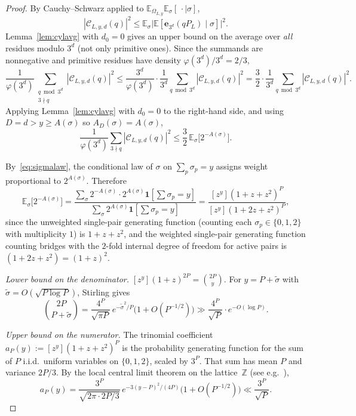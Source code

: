 \documentclass[11pt,a4paper]{amsart}
\theoremstyle{plain}
\theoremstyle{definition}
\newcommand{\Z}{\mathbb{Z}}
\newcommand{\E}{\mathbb{E}}
\begin{document}
\begin{proof}
By Cauchy--Schwarz applied to $\E_{\Omega_{L,y}}\E_\sigma[\,\cdot\mid\sigma]$,
$$
|\mathcal C_{L,y,d}(q)|^2\le\E_\sigma\bigl|\E[\mathbf e_{3^d}(qP_L)\mid\sigma]\bigr|^2.
$$
Lemma~\ref{lem:cylavg} with $d_0=0$ gives an upper bound on the average
over \emph{all} residues modulo $3^d$ (not only primitive ones).
Since the summands are nonnegative and primitive residues have density
$\varphi(3^d)/3^d=2/3$,
$$
\frac{1}{\varphi(3^d)}\sum_{\substack{q\bmod 3^d\\3\nmid q}}|\mathcal C_{L,y,d}(q)|^2
\le\frac{3^d}{\varphi(3^d)}\cdot\frac{1}{3^d}\sum_{q\bmod 3^d}|\mathcal C_{L,y,d}(q)|^2
=\frac32\cdot\frac{1}{3^d}\sum_{q\bmod 3^d}|\mathcal C_{L,y,d}(q)|^2.
$$
Applying Lemma~\ref{lem:cylavg} with $d_0=0$ to the right-hand side, and
using $D=d>y\ge A(\sigma)$ so $A_D(\sigma)=A(\sigma)$,
$$
\frac{1}{\varphi(3^d)}\sum_{3\nmid q}|\mathcal C_{L,y,d}(q)|^2
\le\frac32\,\E_\sigma\bigl[2^{-A(\sigma)}\bigr].
$$

By~\eqref{eq:sigmalaw}, the conditional law of $\sigma$ on
$\sum_p\sigma_p=y$ assigns weight proportional to $2^{A(\sigma)}$.
Therefore
\begin{equation}\label{eq:E2A}
\E_\sigma\bigl[2^{-A(\sigma)}\bigr]
=\frac{\sum_\sigma 2^{-A(\sigma)}\cdot 2^{A(\sigma)}\mathbf 1[\sum\sigma_p=y]}
{\sum_\sigma 2^{A(\sigma)}\mathbf 1[\sum\sigma_p=y]}
=\frac{[z^y](1+z+z^2)^P}{[z^y](1+2z+z^2)^P},
\end{equation}
since the unweighted single-pair generating function (counting each
$\sigma_p\in\{0,1,2\}$ with multiplicity $1$) is $1+z+z^2$, and the
weighted single-pair generating function counting bridges with the $2$-fold
internal degree of freedom for active pairs is $(1+2z+z^2)=(1+z)^2$.

\emph{Lower bound on the denominator.}
$[z^y](1+z)^{2P}=\binom{2P}{y}$.
For $y=P+\tilde\sigma$ with $\tilde\sigma=O(\sqrt{P\log P})$,
Stirling gives
\begin{equation}\label{eq:denom}
\binom{2P}{P+\tilde\sigma}=\frac{4^P}{\sqrt{\pi P}}\,
e^{-\tilde\sigma^2/P}\bigl(1+O(P^{-1/2})\bigr)
\gg \frac{4^P}{\sqrt P}\cdot e^{-O(\log P)}.
\end{equation}

\emph{Upper bound on the numerator.}
The trinomial coefficient $a_P(y):=[z^y](1+z+z^2)^P$ is the probability
generating function for the sum of $P$ i.i.d.\ uniform variables on
$\{0,1,2\}$, scaled by $3^P$.
That sum has mean $P$ and variance $2P/3$.
By the local central limit theorem on the lattice~$\Z$
(see e.g.~\cite[Theorem 2.5.2]{LPW}),
\begin{equation}\label{eq:num}
a_P(y)=\frac{3^P}{\sqrt{2\pi\cdot 2P/3}}\,
e^{-3(y-P)^2/(4P)}\bigl(1+O(P^{-1/2})\bigr)
\ll \frac{3^P}{\sqrt P}.
\end{equation}


\end{proof}
\end{document}
